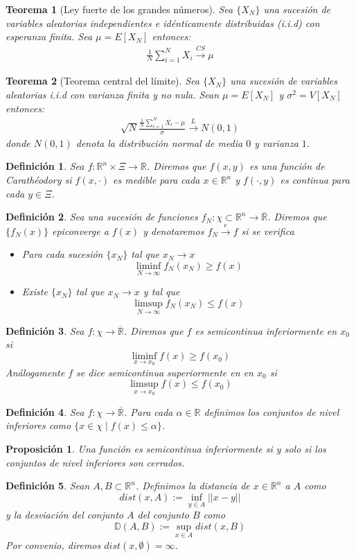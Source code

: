 \documentclass[twoside,a4paper,openright,12pt]{book}
\newtheorem{defi}{Definici\'on}[section]
\newtheorem{prop}{Proposici\'on}[section]
\newtheorem{thm}{Teorema}[section]
\providecommand{\conv}[1]{\overset{#1}{\longrightarrow}}
\providecommand{\convcs}{\xrightarrow{CS}}
\providecommand{\conve}{\xrightarrow{e}}
\providecommand{\func}[2]{\colon{#1}\longrightarrow{#2}}
\newcommand{\R}{\mathbb{R}}
\begin{document}
\newpage 
\begin{thm}[Ley fuerte de los grandes números]\label{grandesnumeros}
Sea $\{X_N\}$ una sucesión de variables aleatorias independientes e idénticamente distribuidas (i.i.d) con esperanza finita. Sea $\mu = E[X_N]$ entonces:
\begin{gather*}
\frac{1}{N} \sum_{i=1}^N X_i \convcs \mu
\end{gather*}
\end{thm}
\begin{thm}[Teorema central del límite]
Sea $\{X_N\}$ una sucesión de variables aleatorias i.i.d con varianza finita y no nula. Sean $\mu = E[X_N]$ y $\sigma^2 = V[X_N]$ entonces:
\begin{gather*}
\sqrt{N}\frac{\frac{1}{N} \sum_{i=1}^N X_i-\mu}{\sigma} \conv{L} N(0,1)
\end{gather*}
donde $N(0,1)$ denota la distribución normal de media $0$ y varianza $1$.
\end{thm}
\begin{defi}
Sea $f\func{\R^n\times \Xi}{\R}$. Diremos que $f(x,y)$ es una función de Carathéodory si $f(x,\cdot)$ es medible para cada $x\in\R^n$ y $f(\cdot,y)$ es continua para cada $y\in\Xi$.
\end{defi}
\begin{defi}
Sea una sucesión de funciones $f_N \func{\chi\subset \R^n}{\overline{\R}}$. Diremos que $\{f_N(x)\}$ epiconverge a $f(x)$ y denotaremos $f_N\conve f$ si se verifica
\begin{itemize}
\item Para cada sucesión $\{x_N\}$ tal que $x_N\to x$ 
$$
\liminf_{N\to\infty} f_N(x_N)\geq f(x)
$$
\item Existe $\{x_N\}$ tal que $x_N \to x$ y tal que
$$
\limsup_{N\to\infty} f_N(x_N)\leq f(x)
$$
\end{itemize}
\end{defi}

\begin{defi}
Sea $f\func{\chi}{\overline{\R}}$. Diremos que $f$ es semicontinua inferiormente en $x_0$ si 
$$
\liminf_{x\to x_0}f(x)\geq f(x_0)
$$
Análogamente $f$ se dice semicontinua superiormente en  en $x_0$ si
$$
\limsup_{x\to x_0}f(x)\leq f(x_0)$$
\end{defi}
\begin{defi}
Sea $f\func{\chi}{\overline{\R}}$. Para cada $\alpha\in\R$ definimos los conjuntos de nivel inferiores como $\{x\in \chi\mid f(x)\leq \alpha\}$.  
\end{defi}
\begin{prop}\label{level}
Una función es semicontinua inferiormente si y solo si los conjuntos de nivel inferiores son cerrados.
\end{prop}
\begin{defi}
Sean $A,B\subset \R^n$. Definimos la distancia de $x\in\R^n$ a $A$ como
$$
dist(x,A):=\inf_{y\in A}||x-y||
$$
y la desviación del conjunto $A$ del conjunto $B$ como
$$
\mathbb{D}(A,B):=\sup_{x\in A}dist(x,B)
$$
Por convenio, diremos $dist(x,\emptyset)=\infty
$. 
\end{defi}
\end{document}
